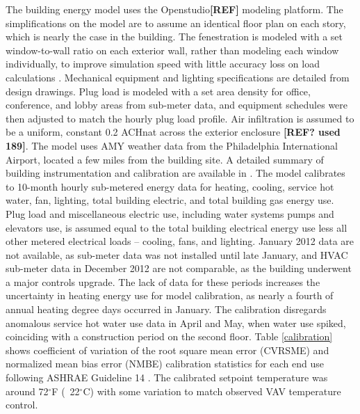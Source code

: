 \documentclass[review]{elsarticle}
\begin{document}
The building energy model uses the Openstudio\textbf{[REF]} modeling platform.  The simplifications on the model are to assume an identical floor plan on each story, which is nearly the case in the building.  The fenestration is modeled with a set window-to-wall ratio on each exterior wall, rather than modeling each window individually, to improve simulation speed with little accuracy loss on load calculations \cite{Liu2011409}.  Mechanical equipment and lighting specifications are detailed from design drawings.  Plug load is modeled with a set area density for office, conference, and lobby areas from sub-meter data, and equipment schedules were then adjusted to match the hourly plug load profile\cite{Delgoshaei2013, Xu2012}.  Air infiltration is assumed to be a uniform, constant 0.2 ACHnat across the exterior enclosure \textbf{[REF? used 189]}. The model uses AMY weather data from the Philadelphia International Airport, located a few miles from the building site. A detailed summary of building instrumentation and calibration are available in \cite{Dasgupta2012, Dahlhausen2014}.    
The model calibrates to 10-month hourly sub-metered energy data for heating, cooling, service hot water, fan, lighting, total building electric, and total building gas energy use. Plug load and miscellaneous electric use, including water systems pumps and elevators use, is assumed equal to the total building electrical energy use less all other metered electrical loads – cooling, fans, and lighting. January 2012 data are not available, as sub-meter data was not installed until late January, and HVAC sub-meter data in December 2012 are not comparable, as the building underwent a major controls upgrade. The lack of data for these periods increases the uncertainty in heating energy use for model calibration, as nearly a fourth of annual heating degree days occurred in January. The calibration disregards anomalous service hot water use data in April and May, when water use spiked, coinciding with a construction period on the second floor. Table \ref{calibration} shows coefficient of variation of the root square mean error (CVRSME) and normalized mean bias error (NMBE) calibration statistics for each end use following ASHRAE Guideline 14 \cite{ASHRAE14}. The calibrated setpoint temperature was around 72$^{\circ}$F (~22$^{\circ}$C)  with some variation to match observed VAV temperature control.
\end{document}
